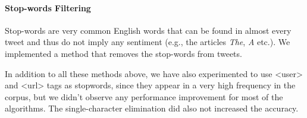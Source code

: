 \paragraph{\textbf{Stop-words Filtering}}
{\setlength{\parindent}{0cm}
Stop-words are very common English words that can be found in almost every tweet and thus do not imply any sentiment (e.g., the articles \textit{The}, \textit{A} etc.).
We implemented a method that removes the stop-words from tweets.}

In addition to all these methods above, we have also experimented to use <user> and <url> tags as stopwords, since they appear in a very high frequency in the corpus, but we didn't observe any performance improvement for most of the algorithms.
The single-character elimination did also not increased the accuracy.

